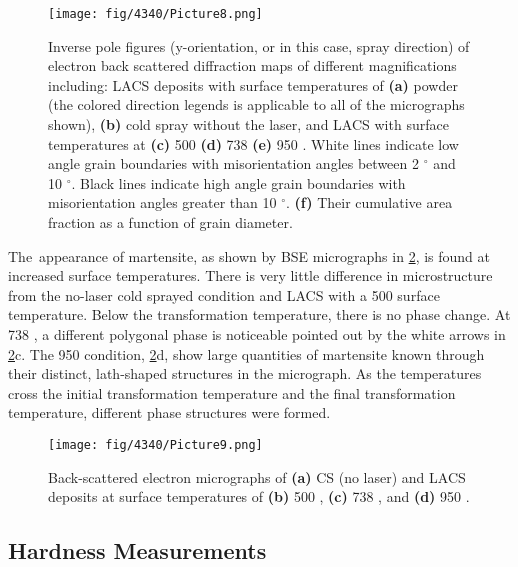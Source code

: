 \begin{figure}
	\centering
	\texttt{[image: fig/4340/Picture8.png]}
	\caption[Inverse pole figures (y-orientation, or in this case, spray direction) of electron back scattered diffraction maps of different magnifications including: LACS deposits.]{Inverse pole figures (y-orientation, or in this case, spray direction) of electron back scattered diffraction maps of different magnifications including: LACS deposits with surface temperatures of \textbf{(a)} powder (the colored direction legends is applicable to all of the micrographs shown), \textbf{(b) }cold spray without the laser, and LACS with surface temperatures at \textbf{(c)} 500 \celsius{} \textbf{(d)} 738 \celsius{} \textbf{(e)} 950 \celsius{}. White lines indicate low angle grain boundaries with misorientation angles between 2 $ ^{\circ} $  and 10 $ ^{\circ} $. Black lines indicate high angle grain boundaries with misorientation angles greater than 10 $ ^{\circ} $. \textbf{(f)} Their cumulative area fraction as a function of grain diameter.}
	\label{fig:43408}
\end{figure}


The\ appearance of martensite, as shown by BSE micrographs in \ref{fig:43409}, is found at increased surface temperatures. There is very little difference in microstructure from the no-laser cold sprayed condition and LACS with a 500 \celsius{} surface temperature. Below the transformation temperature, there is no phase change.  At 738 \celsius{}, a different polygonal phase is noticeable pointed out by the white arrows in \ref{fig:43409}c. The 950 \celsius{} condition, \ref{fig:43409}d, show large quantities of martensite known through their distinct, lath-shaped structures in the micrograph. As the temperatures cross the initial transformation temperature and the final transformation temperature, different phase structures were formed.


\begin{figure}
	\centering
	\texttt{[image: fig/4340/Picture9.png]}
	\caption{Back-scattered electron micrographs of \textbf{(a)} CS (no laser) and LACS deposits at surface temperatures of \textbf{(b)} 500 \celsius{}, \textbf{(c)} 738 \celsius{}, and \textbf{(d)} 950 \celsius{}.}
	\label{fig:43409}
\end{figure}


\subsection*{Hardness Measurements}

